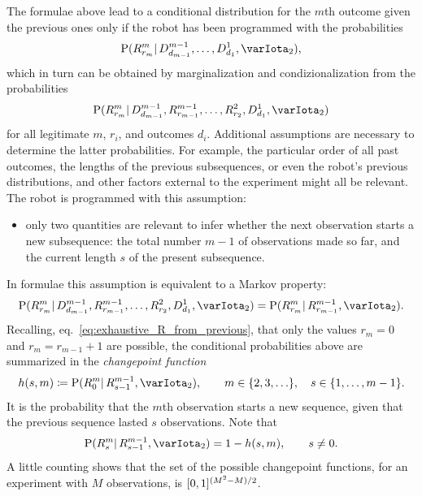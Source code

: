 \documentclass[\ifafour a4paper,12pt,\else a5paper,10pt,\fi%
onecolumn,oneside,article,%
british%
]{memoir}
\theoremstyle{remark}
\theoremstyle{innote}
\newcommand*{\defd}{\coloneqq}
\DeclarePairedDelimiter\clcl{[}{]}
\DeclarePairedDelimiter\set{\{}{\}}
\newcommand*{\p}{\mathrm{P}}%
\renewcommand*{\|}{\mathpunct{|}}
\newcommand*{\eqn}{eq.}%
\newcommand*{\yI}{\varIota}
\newcommand*{\yMc}{\yI_2}
\newcommand*{\yrs}{h}
\begin{document}
The formulae above lead to a conditional distribution for the $m$th outcome
given the previous ones only if the robot has been programmed with the
probabilities
\begin{equation}
  \label{eq:prob_R_conditional_only_data_before}
  \p(R^{m}_{r_{m}} \| D^{m-1}_{d_{m-1}},\dotsc, D^{1}_{d_{1}}, \yMc),
\end{equation}
which in turn can be obtained by marginalization and condizionalization
from the probabilities
\begin{equation}
  \label{eq:prob_R_conditional_before}
  \p(R^{m}_{r_{m}} \| D^{m-1}_{d_{m-1}}, R^{m-1}_{r_{m-1}},\dotsc,
  R^{2}_{r_{2}}, D^{1}_{d_{1}}, \yMc)
\end{equation}
for all legitimate $m$, $r_i$, and outcomes $d_i$. Additional assumptions
are necessary to determine the latter probabilities. For example, the
particular order of all past outcomes, the lengths of the previous
subsequences, or even the robot's previous distributions, and other factors
external to the experiment might all be relevant. The robot is programmed
with this assumption:
\begin{itemize}
\item only two quantities are relevant to infer whether the next
  observation starts a new subsequence: the total number $m-1$ of
  observations made so far, and the current length $s$ of the present
  subsequence.
\end{itemize}
In formulae this assumption is equivalent to a Markov property:
\begin{equation}
  \label{eq:prob_R_markov}
  \p(R^{m}_{r_{m}} \| D^{m-1}_{d_{m-1}}, R^{m-1}_{r_{m-1}},\dotsc,
  R^{2}_{r_{2}}, D^{1}_{d_{1}}, \yMc) =
  \p(R^{m}_{r_{m}} \|  R^{m-1}_{r_{m-1}}, \yMc).
\end{equation}
Recalling, \eqn~\eqref{eq:exhaustive_R_from_previous}, that only the values
$r_{m}=0$ and $r_{m}= r_{m-1}+1$ are possible, the conditional
probabilities above are summarized in the \emph{changepoint function}
\begin{equation}\label{eq:def_changepoint_function}
  \yrs(s,m)  \defd \p(R^{m}_{0} \|  R^{m-1}_{s-1}, \yMc),
  \qquad m \in\set{2,3,\dotsc}, \quad s\in\set{1,\dotsc,m-1}.
\end{equation}
It is the probability that the $m$th observation starts a new sequence,
given that the previous sequence lasted $s$ observations. Note that
\begin{equation}\label{eq:one_minus_h}
  \p(R^{m}_{s} \|  R^{m-1}_{s-1}, \yMc)  = 1-\yrs(s,m),\qquad s\ne 0.
\end{equation}
A little counting shows that the set of the possible changepoint functions,
for an experiment with $M$ observations, is $\clcl{0,1}^{(M^2-M)/2}$.
\end{document}
